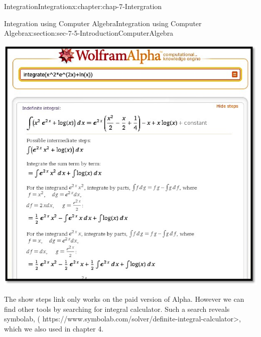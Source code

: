 \documentclass[oneside,10pt,]{book}
\numberwithin{equation}{section}
\begin{document}
\begin{chapterptx}{Integration}{}{Integration}{}{}{x:chapter:chap-7-Intergration}
\begin{sectionptx}{Integration using Computer Algebra}{}{Integration using Computer Algebra}{}{}{x:section:sec-7-5-IntroductionComputerAlgebra}
\begin{sidebyside}{1}{0.1}{0.1}{0}
\begin{sbspanel}{0.8}
\includegraphics[width=\linewidth]{images/sec7-5-8.png}
\end{sbspanel}%
\end{sidebyside}%
\par
The show steps link only works on the paid version of Alpha.  However we can find other tools by searching for integral calculator.  Such a search reveals symbolab, ( https:\slash{}\slash{}www.symbolab.com\slash{}solver\slash{}definite-integral-calculator\textgreater{}, which we also used in chapter 4.%
\begin{sidebyside}{1}{0.05}{0.05}{0}%
\begin{sbspanel}{0.9}%

\end{sbspanel}
\end{sidebyside}
\end{sectionptx}
\end{chapterptx}
\end{document}
